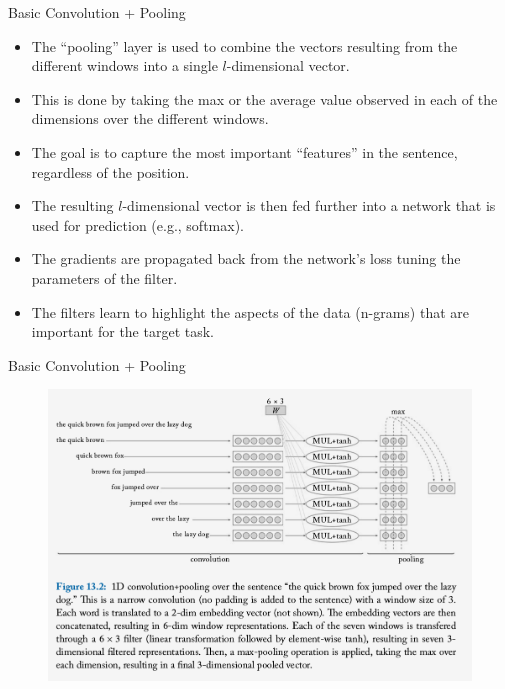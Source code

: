\begin{frame}{Basic Convolution  + Pooling}
\begin{scriptsize}
\begin{itemize}
\item The ``pooling'' layer is used
to combine the vectors resulting from the different windows into a single $l$-dimensional vector.
\item This is done by taking the max or the average value observed in each of the dimensions over the different windows.
\item The goal is to capture the most important ``features'' in the sentence, regardless of the position.
\item The resulting $l$-dimensional vector is then fed further into a network that is used for prediction (e.g., softmax).
\item The gradients are propagated back from the network's loss tuning the parameters of the filter.
\item The filters learn to highlight the aspects of the data (n-grams) that are important for the target task. 
\end{itemize}
\end{scriptsize}
\end{frame}



\begin{frame}{Basic Convolution  + Pooling}
  \begin{figure}[h]
        	\includegraphics[scale = 0.28]{pics/CNN.png}
        \end{figure}
\end{frame}



